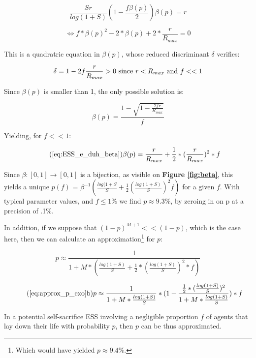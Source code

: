 \documentclass[a4paper,12pt]{report}
\begin{document}
\[\frac{Sr}{log(1+S)}(1-\frac{f\beta(p)}{2})\beta(p)=r  \]

\begin{equation}
    \label{eq:trinome_beta}
    \iff f*\beta(p)^2 - 2*\beta(p) + 2*\frac{r}{R_{max}} = 0
\end{equation}

This is a quadratric equation in $\beta(p)$, whose reduced discriminant $\delta$ verifies:

\[\delta = 1 - 2f\frac{r}{R_{max}} > 0 \textnormal{ since } 
r<R_{max} \textnormal{ and } f << 1 
\]

Since $\beta(p)$ is smaller than 1, the
only possible solution is:

\[\beta(p) = \frac{1 - \sqrt{1-\frac{2fr}{R_{max}}}}{f} \]

Yielding, for $f << 1$:

\begin{equation}\tag{\ref{eq:ESS_e_duh_beta}}
    \beta(p) = \frac{r}{R_{max}}+\frac{1}{2}*(\frac{r}{R_{max}})^2*f
\end{equation}


Since $\beta \colon [0,1] \to [0,1]$ is a bijection, as visible on
 \textbf{Figure \ref{fig:beta}}, 
 this yields a unique $p(f)$ = $\beta^{-1}(\frac{log(1+S}{S} + \frac{1}{2}(\frac{log(1+S)}{S})^2f)$
 for a given $f$. With typical parameter values, and $f\leq 1\%$
 we find $p \approx 9.3\%$, by zeroing in on p at a precision of .1\%.

 In addition, if we suppose that $(1-p)^{M+1} << (1-p)$, which is the case here, then we
 can calculate an approximation\footnote{Which would have yielded
 $p \approx 9.4\%$.} for $p$:

 \[p \approx \frac{1}{1+M*(\frac{log(1+S)}{S} + \frac{1}{2}*(\frac{log(1+S)}{S})^2*f)}\]


 \begin{equation}
    \tag{\ref{eq:approx_p_exo}b}
    p \approx \frac{1}{1+M*\frac{log(1+S)}{S}}*
    (1- \frac{\frac{1}{2}*
    (\frac{log(1+S)}{S})^2}{1+M*\frac{log(1+S)}{S}})*f
    \label{eq:p_grr_approx}
    \end{equation}



 In a potential self-sacrifice ESS involving a negligible proportion $f$ of agents that lay down their
 life with probability $p$, then $p$ can be thus approximated.


 
\end{document}
